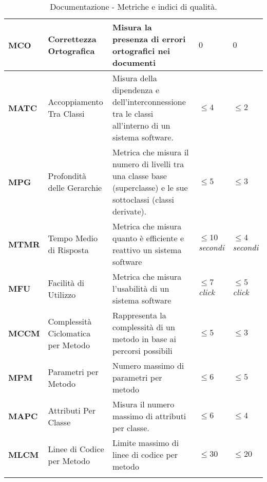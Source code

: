 \begin{longtable}{|C{1.5cm}|L{3cm}|L{4cm}|L{2.5cm}|L{2.5cm}|}
        \hline
         \textbf{MCO} & Correttezza Ortografica & Misura la presenza di errori ortografici nei documenti & $0$ & $0$ \\
        \hline
        \textbf{MATC} & Accoppiamento Tra Classi &   Misura della dipendenza e dell'interconnessione tra le classi all'interno di un sistema software.   & $\leq 4$  & $\leq 2$ \\
        \hline
        \textbf{MPG} & Profondità delle Gerarchie & Metrica che misura il numero di livelli tra una classe base (superclasse) e le sue sottoclassi (classi derivate). & $\leq 5$  & $\leq 3$ \\
        \hline
        \textbf{MTMR} & Tempo Medio di Risposta & Metrica che misura quanto è efficiente e reattivo un sistema software & $\leq 10$ \textit{secondi}  & $\leq 4$ \textit{secondi} \\
        \hline
        \textbf{MFU} & Facilità di Utilizzo & Metrica che misura l'usabilità di un sistema software & $\leq 7$ \textit{click}  & $\leq 5$ \textit{click} \\
        \hline
        \textbf{MCCM} & Complessità Ciclomatica per Metodo & Rappresenta la complessità di un metodo in base ai percorsi possibili & $\leq 5$ & $\leq 3$ \\
        \hline
        \textbf{MPM} & Parametri per Metodo & Numero massimo di parametri per metodo & $\leq 6$ & $\leq 5$ \\
        \hline
        \textbf{MAPC} & Attributi Per Classe & Misura il numero massimo di attributi per classe. & $\leq 6$ & $\leq 4$ \\
        \hline
         \textbf{MLCM} & Linee di Codice per Metodo & Limite massimo di linee di codice per metodo & $\leq 30$ & $\leq 20$ \\
        \hline
        \caption{Documentazione - Metriche e indici di qualità.}
        \label{tab:metriche_testo}
    \end{longtable}